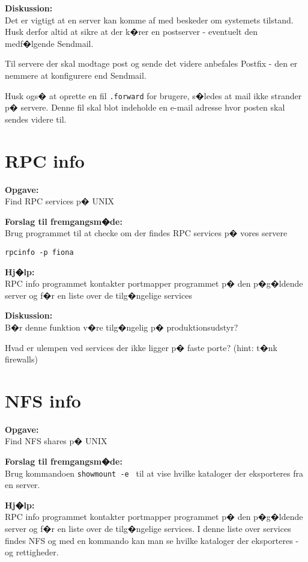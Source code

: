 \documentclass[a4paper,11pt,notitlepage]{oevelser}
\begin{document}
{\bfseries Diskussion:}\\
Det er vigtigt at en server kan komme af med beskeder om systemets
tilstand. Husk derfor altid at sikre at der k�rer en postserver -
eventuelt den medf�lgende Sendmail.

Til servere der skal modtage post og sende det videre anbefales
Postfix - den er nemmere at konfigurere end Sendmail.

Husk ogs� at oprette en fil \verb+.forward+ for brugere, s�ledes at
mail ikke strander p� servere. Denne fil skal blot indeholde en e-mail
adresse hvor posten skal sendes videre til.



\chapter{RPC info}
\label{ex:unix-rpcinfo}

{\bfseries Opgave:} \\
Find RPC services p� UNIX

{\bfseries Forslag til fremgangsm�de:} \\
Brug programmet til at checke om der findes RPC services p� vores servere

\verb+rpcinfo -p fiona+

{\bfseries Hj�lp:} \\
RPC info programmet kontakter portmapper programmet p� den p�g�ldende
server og f�r en liste over de tilg�ngelige services

{\bfseries Diskussion:}\\
B�r denne funktion v�re tilg�ngelig p� produktionsudstyr?

Hvad er ulempen ved services der ikke ligger p� faste porte?
(hint: t�nk firewalls)

\chapter{NFS info}
\label{ex:unix-nfsinfo}

{\bfseries Opgave:} \\
Find NFS shares p� UNIX

{\bfseries Forslag til fremgangsm�de:} \\
Brug kommandoen \verb+showmount -e + til at vise hvilke kataloger der
eksporteres fra en server.

{\bfseries Hj�lp:} \\
RPC info programmet kontakter portmapper programmet p� den p�g�ldende
server og f�r en liste over de tilg�ngelige services. I denne liste over services findes NFS
og med en kommando kan man se hvilke kataloger der eksporteres - og rettigheder.
\end{document}
